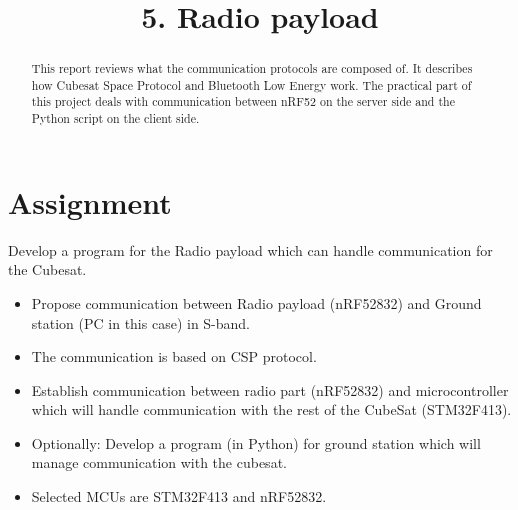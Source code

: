 \documentclass[conference]{IEEEtran}
\begin{document}
\title{5. Radio payload}

\author{
\and
{}
\and
{}
}

\maketitle

\begin{abstract}
This report reviews what the communication protocols are composed of. It describes how Cubesat Space Protocol and Bluetooth Low Energy work. The practical part of this project deals with communication between nRF52 on the server side and the Python script on the client side.
\end{abstract}


\section{Assignment}
Develop a program for the Radio payload which can handle communication for the Cubesat.
\begin{itemize}
\item Propose communication between Radio payload (nRF52832) and Ground station (PC in this case) in S-band.
\item The communication is based on CSP protocol.
\item Establish communication between radio part (nRF52832) and microcontroller which will handle communication with the rest of the CubeSat (STM32F413).
\item Optionally: Develop a program (in Python) for ground station which will manage communication with the cubesat.
\item Selected MCUs are STM32F413 and nRF52832.
\end{itemize}
\end{document}
